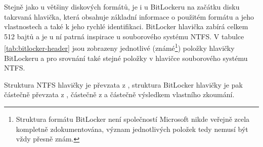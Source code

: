 \label{sec:header}

Stejně jako u většiny diskových formátů, je i u BitLockeru na začátku disku takzvaná hlavička, která obsahuje základní informace o použitém formátu a jeho vlastnostech a také k jeho rychlé identifikaci. BitLocker hlavička zabírá celkem 512 bajtů a je u ní patrná inspirace u souborového systému NTFS. V tabulce \ref{tab:bitlocker-header} jsou zobrazeny jednotlivé (známé\footnote{Struktura formátu BitLocker není společností Microsoft nikde veřejně zcela kompletně zdokumentována, význam jednotlivých položek tedy nemusí být vždy přesně znám.}) položky hlavičky BitLockeru a pro srovnání také stejné položky v hlavičce souborového systému NTFS.

Struktura NTFS hlavičky je převzata z \cite{Carrier2005}, struktura BitLocker hlavičky je pak částečně převzata z \cite{j2YgJeTq3IrWJRcd}, částečně z \cite{Ferguson2006} a částečně výsledkem vlastního zkoumání.

